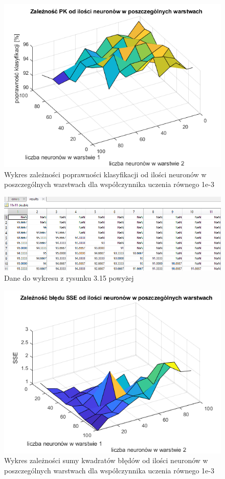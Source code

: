 \documentclass[a4paper, 12pt]{article}
\begin{document}
\begin{figure}[ht]
	\centering
	\includegraphics[width=12cm]{images/lr3 pk}
	\caption{Wykres zależności poprawności klasyfikacji od ilości neuronów w poszczególnych warstwach dla współczynnika uczenia równego 1e-3}
\label{Fig:lr1 pk}
\end{figure}

\begin{figure}[ht]
	\centering
	\includegraphics[width=12cm]{images/lr3 pk dane}
	\caption{Dane do wykresu z rysunku 3.15 powyżej}
\label{Fig:lr1 pk dane}
\end{figure}

\clearpage

\begin{figure}[ht]
	\centering
	\includegraphics[width=12cm]{images/lr3 sse}
	\caption{Wykres zależności sumy kwadratów błędów od ilości neuronów w poszczególnych warstwach dla współczynnika uczenia równego 1e-3}
\label{Fig:lr1 sse}
\end{figure}
\end{document}
